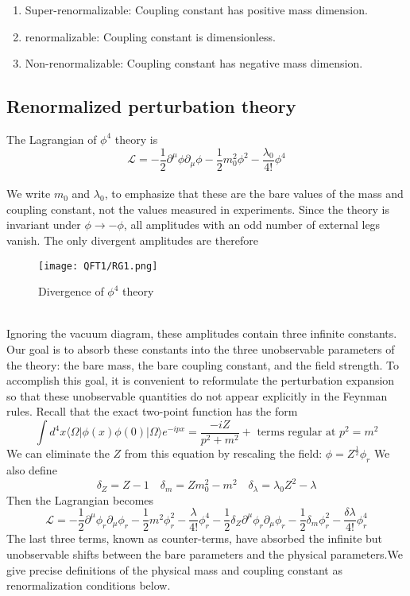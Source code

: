 \begin{enumerate}
\item Super-renormalizable: Coupling constant has positive mass dimension.
\item  renormalizable: Coupling constant is dimensionless.
\item  Non-renormalizable: Coupling constant has negative mass dimension.
\end{enumerate}

\subsection{Renormalized perturbation theory}
The Lagrangian of $\phi^4$ theory is 
\[\mathcal{L} = -\frac{1}{2} \partial^{\mu} \phi \partial_{\mu} \phi -\frac{1}{2}m_0^2 \phi^2 - \frac{\lambda_0}{4!}\phi^4\]
\\
We write $m_0$ and $\lambda_0$, to emphasize that these are the bare values of the mass and coupling constant, not the values measured in experiments.
Since the theory is invariant under $\phi \to -\phi$, all amplitudes with an odd number of external legs vanish. The only divergent amplitudes are therefore
\begin{figure}[!h]
\centering
\texttt{[image: QFT1/RG1.png]}
\caption{Divergence of $\phi^4$ theory}
\end{figure}
\\
Ignoring the vacuum diagram, these amplitudes contain three infinite constants. Our goal is to absorb these constants into the three unobservable parameters of the theory: the bare mass, the bare coupling constant, and the field strength. To accomplish this goal, it is convenient to reformulate the perturbation expansion so that these unobservable quantities do not appear
explicitly in the Feynman rules. Recall that the exact two-point function has the form
\[\int d^4x \langle \Omega | \phi(x) \phi(0) | \Omega \rangle e^{-ipx} = \frac{-iZ}{p^2+m^2} + \mbox{ terms regular at } p^2 = m^2\]
We can eliminate the $Z$ from this equation by rescaling the field:
$\phi = Z^{\frac{1}{2}} \phi_r$
We also define
\[\delta_Z = Z -1 \quad \delta_m = Zm_0^2 - m^2 \quad \delta_{\lambda} = \lambda_0 Z^2 - \lambda\]
Then the Lagrangian becomes
\[\mathcal{L} = -\frac{1}{2} \partial^{\mu} \phi_r \partial_{\mu} \phi_r -\frac{1}{2}m^2 \phi_r^2 - \frac{\lambda}{4!}\phi_r^4 -\frac{1}{2} \delta_Z \partial^{\mu} \phi_r \partial_{\mu} \phi_r -\frac{1}{2}\delta_m \phi_r^2 - \frac{\delta \lambda}{4!}\phi_r^4\]
The last three terms, known as counter-terms, have absorbed the infinite but unobservable shifts between the bare parameters and the physical parameters.We give precise definitions of the physical mass and coupling constant as renormalization conditions below.
